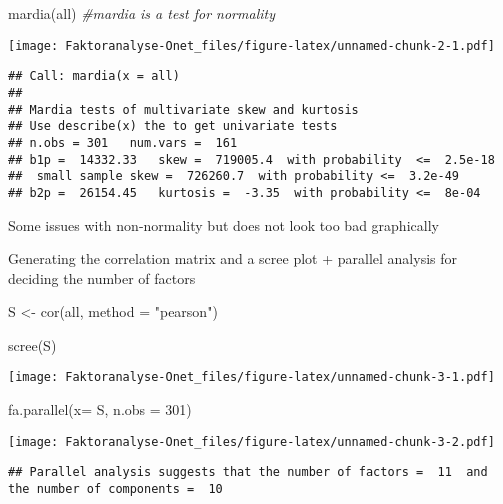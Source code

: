 \documentclass[
]{article}
\newenvironment{Shaded}{\begin{snugshade}}{\end{snugshade}}
\newcommand{\AttributeTok}[1]{\textcolor[rgb]{0.77,0.63,0.00}{#1}}
\newcommand{\CommentTok}[1]{\textcolor[rgb]{0.56,0.35,0.01}{\textit{#1}}}
\newcommand{\DecValTok}[1]{\textcolor[rgb]{0.00,0.00,0.81}{#1}}
\newcommand{\FunctionTok}[1]{\textcolor[rgb]{0.00,0.00,0.00}{#1}}
\newcommand{\NormalTok}[1]{#1}
\newcommand{\OtherTok}[1]{\textcolor[rgb]{0.56,0.35,0.01}{#1}}
\newcommand{\StringTok}[1]{\textcolor[rgb]{0.31,0.60,0.02}{#1}}
\begin{document}
\begin{Shaded}
\begin{Highlighting}[]
\FunctionTok{mardia}\NormalTok{(all) }\CommentTok{\#mardia is a test for normality}
\end{Highlighting}
\end{Shaded}

\texttt{[image: Faktoranalyse-Onet\_files/figure-latex/unnamed-chunk-2-1.pdf]}

\begin{verbatim}
## Call: mardia(x = all)
## 
## Mardia tests of multivariate skew and kurtosis
## Use describe(x) the to get univariate tests
## n.obs = 301   num.vars =  161 
## b1p =  14332.33   skew =  719005.4  with probability  <=  2.5e-18
##  small sample skew =  726260.7  with probability <=  3.2e-49
## b2p =  26154.45   kurtosis =  -3.35  with probability <=  8e-04
\end{verbatim}

Some issues with non-normality but does not look too bad graphically

Generating the correlation matrix and a scree plot + parallel analysis
for deciding the number of factors

\begin{Shaded}
\begin{Highlighting}[]
\NormalTok{S }\OtherTok{\textless{}{-}} \FunctionTok{cor}\NormalTok{(all, }\AttributeTok{method =} \StringTok{"pearson"}\NormalTok{)}

\FunctionTok{scree}\NormalTok{(S)}
\end{Highlighting}
\end{Shaded}

\texttt{[image: Faktoranalyse-Onet\_files/figure-latex/unnamed-chunk-3-1.pdf]}

\begin{Shaded}
\begin{Highlighting}[]
\FunctionTok{fa.parallel}\NormalTok{(}\AttributeTok{x=}\NormalTok{ S, }\AttributeTok{n.obs =} \DecValTok{301}\NormalTok{)}
\end{Highlighting}
\end{Shaded}

\texttt{[image: Faktoranalyse-Onet\_files/figure-latex/unnamed-chunk-3-2.pdf]}

\begin{verbatim}
## Parallel analysis suggests that the number of factors =  11  and the number of components =  10
\end{verbatim}
\end{document}
